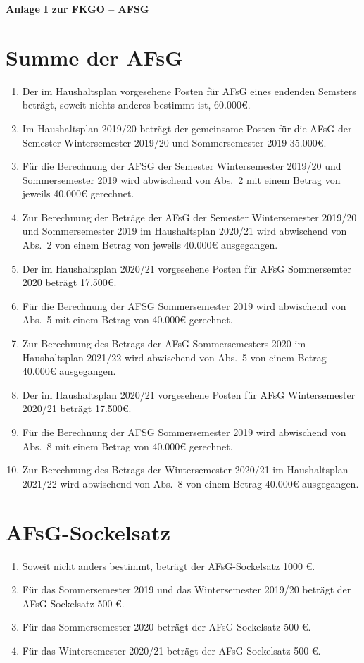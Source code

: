 \documentclass{article}
\begin{document}
\begin{center}
    \huge \textbf{Anlage I zur FKGO -- AFSG}
\end{center}


\section{Summe der AFsG}
\begin{enumerate}[(1)]
	\item Der im Haushaltsplan vorgesehene Posten für AFsG eines endenden Semsters beträgt, soweit nichts anderes bestimmt ist, 60.000€.
	\item Im Haushaltsplan 2019/20 beträgt der gemeinsame Posten für die AFsG der Semester Wintersemester 2019/20 und Sommersemester 2019  35.000€.
	\item Für die Berechnung der AFSG der Semester Wintersemester 2019/20 und Sommersemester 2019 wird abwischend von Abs.\ 2 mit einem Betrag von jeweils 40.000€ gerechnet.
	\item Zur Berechnung der Beträge der AFsG der Semester Wintersemester 2019/20 und Sommersemester 2019 im Haushaltsplan 2020/21 wird abwischend von Abs.\ 2 von einem Betrag von jeweils 40.000€ ausgegangen.
	
	\item Der im Haushaltsplan 2020/21 vorgesehene Posten für AFsG Sommersemter 2020 beträgt 17.500€.
	\item Für die Berechnung der AFSG Sommersemester 2019 wird abwischend von Abs.\ 5 mit einem Betrag von 40.000€ gerechnet.
	\item Zur Berechnung des Betrags der AFsG Sommersemesters 2020 im Haushaltsplan 2021/22 wird abwischend von Abs.\ 5 von einem Betrag 40.000€ ausgegangen.
	
	\item Der im Haushaltsplan 2020/21 vorgesehene Posten für AFsG Wintersemester 2020/21 beträgt 17.500€.
	\item Für die Berechnung der AFSG Sommersemester 2019 wird abwischend von Abs.\ 8 mit einem Betrag von 40.000€ gerechnet.
	\item Zur Berechnung des Betrags der Wintersemester 2020/21 im Haushaltsplan 2021/22 wird abwischend von Abs.\ 8 von einem Betrag 40.000€ ausgegangen.
\end{enumerate}

\section{AFsG-Sockelsatz}
\begin{enumerate}[(1)]
	\item Soweit nicht anders bestimmt, beträgt der AFsG-Sockelsatz 1000 €.
	\item Für das Sommersemester 2019 und das Wintersemester 2019/20 beträgt der AFsG-Sockelsatz 500 €.
	\item Für das Sommersemester 2020 beträgt der AFsG-Sockelsatz 500 €.
	\item Für das Wintersemester 2020/21 beträgt der AFsG-Sockelsatz 500 €.
\end{enumerate}
\end{document}

